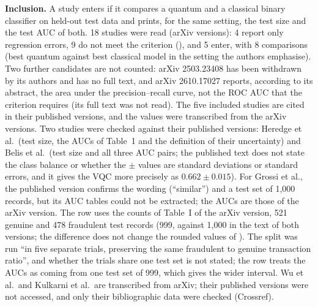 \documentclass[11pt,a4paper]{article}
\begin{document}
\textbf{Inclusion.} A study enters  if it compares a quantum and a classical binary classifier on held-out test data and prints, for the same setting, the test size and the test AUC of both. 18 studies were read (arXiv versions): 4 report only regression errors, 9 do not meet the criterion (), and 5 enter, with 8 comparisons (best quantum against best classical model in the setting the authors emphasise). Two further candidates are not counted: arXiv 2503.23408 has been withdrawn by its authors and has no full text, and arXiv 2610.17027 reports, according to its abstract, the area under the precision--recall curve, not the ROC AUC that the criterion requires (its full text was not read). The five included studies are cited in their published versions, and the values were transcribed from the arXiv versions. Two studies were checked against their published versions: Heredge et al.\ (test size, the AUCs of Table~1 and the definition of their uncertainty) and Belis et al.\ (test size and all three AUC pairs; the published text does not state the class balance or whether the $\pm$ values are standard deviations or standard errors, and it gives the VQC more precisely as $0.662\pm0.015$). For Grossi et al., the published version confirms the wording (``similar'') and a test set of 1{,}000 records, but its AUC tables could not be extracted; the AUCs are those of the arXiv version. The row uses the counts of Table~I of the arXiv version, 521 genuine and 478 fraudulent test records (999, against 1{,}000 in the text of both versions; the difference does not change the rounded values of ). The split was run ``in five separate trials, preserving the same fraudulent to genuine transaction ratio'', and whether the trials share one test set is not stated; the row treats the AUCs as coming from one test set of 999, which gives the wider interval. Wu et al.\ and Kulkarni et al.\ are transcribed from arXiv; their published versions were not accessed, and only their bibliographic data were checked (Crossref).
\end{document}
